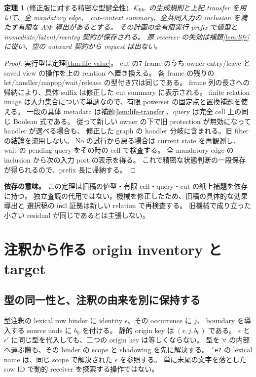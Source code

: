 \documentclass[11pt,a4paper]{article}
\newtheorem{theorem}[definition]{定理}
\newcommand{\Core}{\mathcal K}
\begin{document}
\begin{theorem}[修正版に対する精密な型健全性]
\label{thm:life-full}
\(\Core_{\rm life}\) の生成規則と上記 transfer を用いて、全 mandatory edge、
cut-context summary、全共同入力の inclusion を満たす有限な \(A!\Phi\) 導出があるとする。
その計画の全有限実行 prefix で値型と immediate/latent/reentry 契約が保存される。
原 receiver の失効は補題\ref{lem:life}に従い、空の outward 契約から request は出ない。
\end{theorem}
\begin{proof}
実行型は定理\ref{thm:life-value}。
cut の7 frame のうち owner entry/leave と saved view の操作を上の relation へ置き換える。
各 frame の残りの let/handler/mapop/wait/release の型付き穴は同じである。
frame 列の長さへの帰納により、具体 suffix は修正した cut summary に表示される。
finite relation image は入力集合について単調なので、有限 powerset の固定点と置換補題を使える。
一段の具体 metadata は補題\ref{lem:life-transfer}、query は完全 cell 上の同じ Boolean 式である。
従って新しい owner の下で旧 protection が無効になって handler が選べる場合も、
修正した graph の handler 分岐に含まれる。旧 filter の結論を流用しない。
No の試行から戻る場合は current state を再観測し、wait の pending query をその時の cell で検査する。
全 mandatory edge の inclusion から次の入力 port の表示を得る。
これで精密な状態判断の一段保存が得られるので、prefix 長に帰納する。
\end{proof}

\textbf{依存の意味。}
この定理は旧稿の値型・有限 cell・query・cut の紙上補題を依存に持つ。
独立査読の代用ではない。機械を修正したため、旧稿の具体的な効果導出と
選択稿の \(\mathsf{incl}\) 証拠は新しい relation で再検査する。
旧機械で成り立った小さい residual が同じであるとは主張しない。

\section{注釈から作る origin inventory と target}
\label{sec:origin}

\subsection{型の同一性と、注釈の由来を別に保持する}

型注釈の lexical row binder に identity \(\epsilon\)、その occurrence に \(j\)、
boundary を導入する source node に \(b_0\) を付ける。
静的 origin key は \((\epsilon,j,b_0)\) である。
\(\epsilon\) と \(\epsilon'\) に同じ型を代入しても、二つの origin key は等しくならない。
型を \(\forall\) の内部へ運ぶ際も、その binder の scope と shadowing を先に解決する。
\texttt{'e?} の lexical name は、同じ scope で解決された \(\epsilon\) を参照する。
単に末尾の文字を落とした row ID で動的 receiver を探索する操作ではない。
\end{document}
